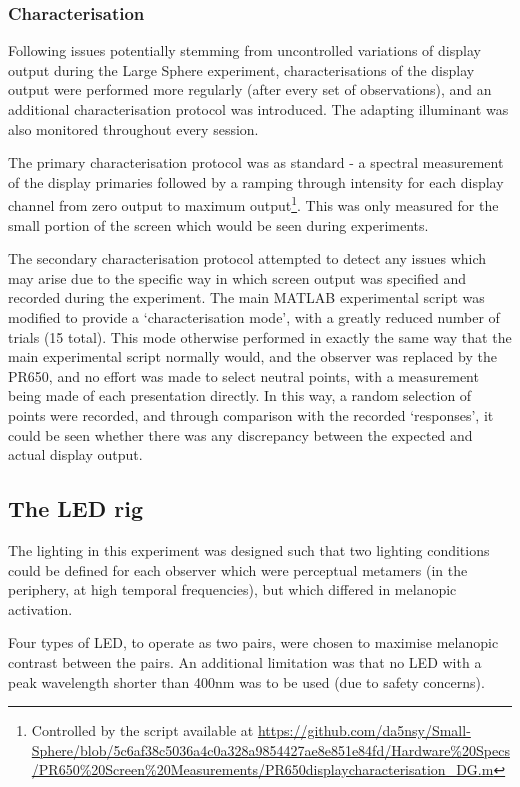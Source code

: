 \subsubsection{Characterisation}

Following issues potentially stemming from uncontrolled variations of display output during the Large Sphere experiment, characterisations of the display output were performed more regularly (after every set of observations), and an additional characterisation protocol was introduced. The adapting illuminant was also monitored throughout every session.

The primary characterisation protocol was as standard - a spectral measurement of the display primaries followed by a ramping through intensity for each display channel from zero output to maximum output\footnote{Controlled by the script available at \url{https://github.com/da5nsy/Small-Sphere/blob/5c6af38c5036a4c0a328a9854427ae8e851e84fd/Hardware\%20Specs/PR650\%20Screen\%20Measurements/PR650displaycharacterisation_DG.m}}. This was only measured for the small portion of the screen which would be seen during experiments.

The secondary characterisation protocol attempted to detect any issues which may arise due to the specific way in which screen output was specified and recorded during the experiment. The main MATLAB experimental script was modified to provide a `characterisation mode', with a greatly reduced number of trials (15 total). This mode otherwise performed in exactly the same way that the main experimental script normally would, and the observer was replaced by the \gls{PR650}, and no effort was made to select neutral points, with a measurement being made of each presentation directly. In this way, a random selection of points were recorded, and through comparison with the recorded `responses', it could be seen whether there was any discrepancy between the expected and actual display output.

\subsection{The LED rig}

The lighting in this experiment was designed such that two lighting conditions could be defined for each observer which were perceptual metamers (in the periphery, at high temporal frequencies), but which differed in melanopic activation.

Four types of \gls{LED}, to operate as two pairs, were chosen to maximise melanopic contrast between the pairs. An additional limitation was that no LED with a peak wavelength shorter than 400nm was to be used (due to safety concerns).

